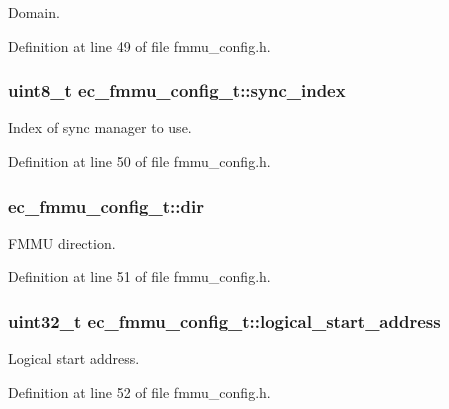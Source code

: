 Domain. 



Definition at line 49 of file fmmu\-\_\-config.\-h.

\subsubsection[{sync\-\_\-index}]{\setlength{\rightskip}{0pt plus 5cm}uint8\-\_\-t ec\-\_\-fmmu\-\_\-config\-\_\-t\-::sync\-\_\-index}\label{structec__fmmu__config__t_aa77d8e55cd99d08955d2566fc2ab4eec}


Index of sync manager to use. 



Definition at line 50 of file fmmu\-\_\-config.\-h.

\subsubsection[{dir}]{ ec\-\_\-fmmu\-\_\-config\-\_\-t\-::dir}\label{structec__fmmu__config__t_af157af45ceab69c17a76a02c342fd164}


F\-M\-M\-U direction. 



Definition at line 51 of file fmmu\-\_\-config.\-h.

\subsubsection[{logical\-\_\-start\-\_\-address}]{\setlength{\rightskip}{0pt plus 5cm}uint32\-\_\-t ec\-\_\-fmmu\-\_\-config\-\_\-t\-::logical\-\_\-start\-\_\-address}\label{structec__fmmu__config__t_a04092cc6d2d3d1c5a4d1703265e414cc}


Logical start address. 



Definition at line 52 of file fmmu\-\_\-config.\-h.

